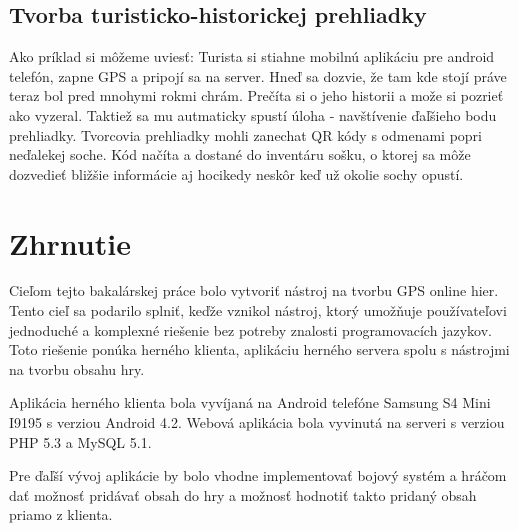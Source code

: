 \subsection{Tvorba turisticko-historickej prehliadky}
Ako príklad si môžeme uviesť: Turista si stiahne mobilnú aplikáciu pre android telefón, zapne GPS a pripojí sa na server. Hneď sa dozvie, že tam kde stojí práve teraz bol pred mnohymi rokmi chrám. Prečíta si o jeho historii a može si pozrieť ako vyzeral. Taktiež sa mu autmaticky spustí úloha - navštívenie ďaľšieho bodu prehliadky. Tvorcovia prehliadky mohli zanechat QR kódy s odmenami popri neďalekej soche. Kód načíta a dostané do inventáru sošku, o ktorej sa môže dozvedieť bližšie informácie aj hocikedy neskôr keď už okolie sochy opustí. 

\section{Zhrnutie}
Cieľom tejto bakalárskej práce bolo vytvoriť nástroj na tvorbu GPS online hier. Tento cieľ sa podarilo splniť, keďže vznikol nástroj, ktorý umožňuje používateľovi jednoduché a komplexné riešenie bez potreby znalosti programovacích jazykov. Toto riešenie ponúka herného klienta, aplikáciu herného servera spolu s nástrojmi na tvorbu obsahu hry. \

Aplikácia herného klienta bola vyvíjaná na Android telefóne Samsung S4 Mini I9195 s verziou Android 4.2. Webová aplikácia bola vyvinutá na serveri s verziou PHP 5.3 a MySQL 5.1. \

Pre ďaľší vývoj aplikácie by bolo vhodne implementovať bojový systém a hráčom dať možnosť pridávať obsah do hry a možnosť hodnotiť takto pridaný obsah priamo z klienta.